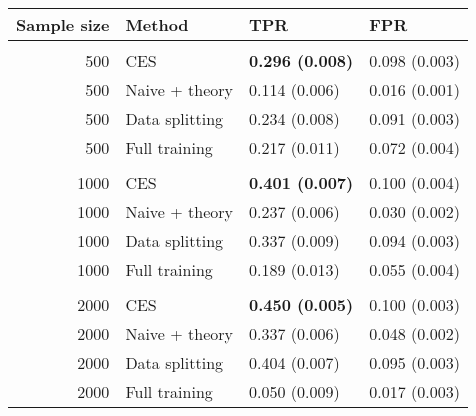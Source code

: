 
\begin{tabular}{rlll}
\toprule
Sample size & Method & TPR & FPR\\
\midrule
\addlinespace[0.3em]
\multicolumn{4}{l}{\textbf{500}}\\
\hspace{1em}500 & CES & \textbf{0.296 (0.008)} & 0.098 (0.003)\\
\hspace{1em}500 & Naive + theory & 0.114 (0.006) & 0.016 (0.001)\\
\hspace{1em}500 & Data splitting & 0.234 (0.008) & 0.091 (0.003)\\
\hspace{1em}500 & Full training & 0.217 (0.011) & 0.072 (0.004)\\
\addlinespace[0.3em]
\multicolumn{4}{l}{\textbf{1000}}\\
\hspace{1em}1000 & CES & \textbf{0.401 (0.007)} & 0.100 (0.004)\\
\hspace{1em}1000 & Naive + theory & 0.237 (0.006) & 0.030 (0.002)\\
\hspace{1em}1000 & Data splitting & 0.337 (0.009) & 0.094 (0.003)\\
\hspace{1em}1000 & Full training & 0.189 (0.013) & 0.055 (0.004)\\
\addlinespace[0.3em]
\multicolumn{4}{l}{\textbf{2000}}\\
\hspace{1em}2000 & CES & \textbf{0.450 (0.005)} & 0.100 (0.003)\\
\hspace{1em}2000 & Naive + theory & 0.337 (0.006) & 0.048 (0.002)\\
\hspace{1em}2000 & Data splitting & 0.404 (0.007) & 0.095 (0.003)\\
\hspace{1em}2000 & Full training & 0.050 (0.009) & 0.017 (0.003)\\
\bottomrule
\end{tabular}

